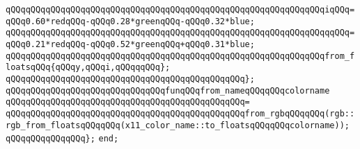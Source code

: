 \verb|qQQqqQQqqQQqqQQqqQQqqQQqqQQqqQQqqQQqqQQqqQQqqQQqqQQqqQQqqQQqqQQqiqQQq=qQQq0.60*redqQQq-qQQq0.28*greenqQQq-qQQq0.32*blue;|\newline
\verb|qQQqqQQqqQQqqQQqqQQqqQQqqQQqqQQqqQQqqQQqqQQqqQQqqQQqqQQqqQQqqQQqqqQQq=qQQq0.21*redqQQq-qQQq0.52*greenqQQq+qQQq0.31*blue;|\newline
\newline
\verb|qQQqqQQqqQQqqQQqqQQqqQQqqQQqqQQqqQQqqQQqqQQqqQQqqQQqqQQqqQQqqQQqfrom_floatsqQQq{qQQqy,qQQqi,qQQqqqQQq};|\newline
\verb|qQQqqQQqqQQqqQQqqQQqqQQqqQQqqQQqqQQqqQQqqQQqqQQq};|\newline
\newline
\verb|qQQqqQQqqQQqqQQqqQQqqQQqqQQqqQQqfunqQQqfrom_nameqQQqqQQqcolorname|\newline
\verb|qQQqqQQqqQQqqQQqqQQqqQQqqQQqqQQqqQQqqQQqqQQqqQQq=|\newline
\verb|qQQqqQQqqQQqqQQqqQQqqQQqqQQqqQQqqQQqqQQqqQQqqQQqfrom_rgbqQQqqQQq(rgb::rgb_from_floatsqQQqqQQq(x11_color_name::to_floatsqQQqqQQqcolorname));|\newline
\verb|qQQqqQQqqQQqqQQq};|\newline
\newline
\verb|end;|\newline
\newline

